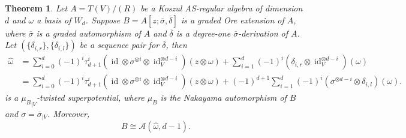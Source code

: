 \documentclass[a4paper,10pt]{amsart}
\newtheorem{theorem}{Theorem}[section]
\theoremstyle{definition}
\numberwithin{equation}{section}
\DeclareMathOperator{\id}{id}
\begin{document}
\begin{theorem}\label{thm: twisted superpotential for B} Let $A=T(V)/(R)$ be a Koszul AS-regular algebra of dimension $d$ and $\omega$ a basis of $W_d$. Suppose $B=A[z;\overline{\sigma},\overline{\delta}]$ is a graded Ore extension of $A$, where $\overline{\sigma}$ is a graded automorphism of $A$ and $\overline{\delta}$ is a degree-one $\overline{\sigma}$-derivation of $A$. Let $(\{\delta_{i,r}\},\{\delta_{i,l}\})$ be a sequence pair for $\overline{\delta}$, then
\begin{align}
\hat{\omega}&=\sum_{i=0}^d (-1)^i\tau_{d+1}^i(\id\otimes \sigma^{\otimes i}\otimes\id_V^{\otimes d-i})(z\otimes\omega)+\sum_{i=1}^d (-1)^i(\delta_{i,r}\otimes\id_V^{\otimes d-i})(\omega)\label{twsited superpotential1}\\
&=\sum_{i=0}^d (-1)^i\tau_{d+1}^i(\id\otimes \sigma^{\otimes i}\otimes\id_V^{\otimes d-i})(z\otimes\omega)+(-1)^{d+1}\sum_{i=1}^d (-1)^{i}(\sigma^{\otimes d-i}\otimes \delta_{i,l})(\omega).\label{twsited superpotential2}
\end{align}
is a ${\mu_B}_{\mid V}$-twisted superpotential, where $\mu_B$ is the Nakayama automorphism of $B$ and $\sigma=\overline{\sigma}_{\mid V}$. Moreover,
$$B\cong \mathcal{A}(\hat{\omega},d-1).$$
\end{theorem}
\end{document}
